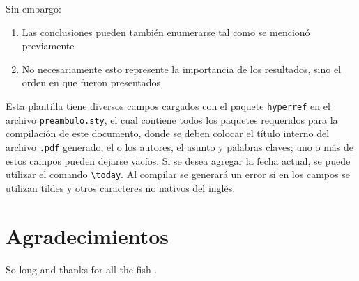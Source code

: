 \documentclass[fleqn,10pt]{SelfArx} %
\begin{document}
\vspace{1ex} \noindent Sin embargo:\vspace{1ex}

\begin{enumerate}
    \item Las conclusiones pueden también enumerarse tal como se mencionó previamente
    \item No necesariamente esto represente la importancia de los resultados, sino el orden en que fueron presentados
\end{enumerate}

\vspace{1ex} Esta plantilla tiene diversos campos cargados con el paquete \texttt{hyperref} en el archivo \texttt{preambulo.sty}, el cual contiene todos los paquetes requeridos para la compilación de este documento, donde se deben colocar el título interno del archivo \texttt{.pdf} generado, el o los autores, el asunto y palabras claves; uno o más de estos campos pueden dejarse vacíos. Si se desea agregar la fecha actual, se puede utilizar el comando \verb|\today|. Al compilar se generará un error si en los campos se utilizan tildes y otros caracteres no nativos del inglés. \cite{Figueredo:2009dg}

\section*{Agradecimientos} %


So long and thanks for all the fish \cite{Figueredo:2009dg, Smith:2012qr}.





\end{document}
